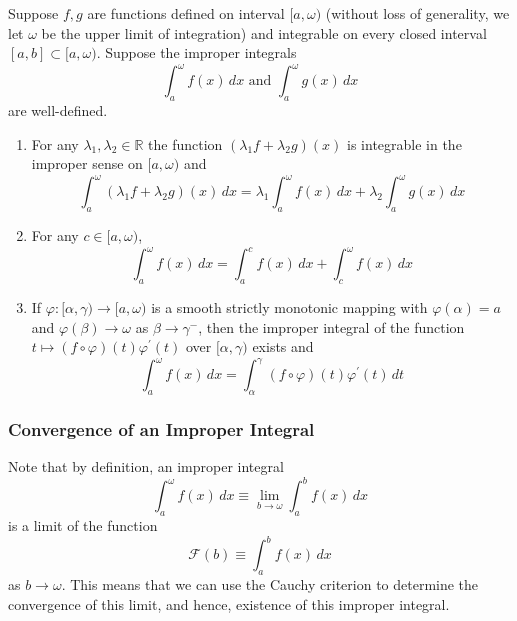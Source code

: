 \documentclass{article}
\begin{document}
      \begin{lemma}
        Suppose $f, g$ are functions defined on interval $[a, \omega)$ (without loss of generality, we let $\omega$ be the upper limit of integration) and integrable on every closed interval $[a, b] \subset [a, \omega)$. Suppose the improper integrals 
        \[\int_a^\omega f(x)\,dx \text{ and } \int_a^\omega g(x)\,dx\]
        are well-defined. 
        \begin{enumerate}
          \item For any $\lambda_1, \lambda_2 \in \mathbb{R}$ the function $(\lambda_1 f + \lambda_2 g)(x)$ is integrable in the improper sense on $[a, \omega)$ and
          \[\int_a^\omega (\lambda_1 f + \lambda_2 g)(x)\,dx = \lambda_1 \int_a^\omega f(x)\,dx + \lambda_2 \int_a^\omega g(x)\,dx\]
          \item For any $c \in [a, \omega)$, 
          \[\int_a^\omega f(x)\,dx = \int_a^c f(x)\,dx + \int_c^\omega f(x)\,dx\]
          \item If $\varphi: [\alpha, \gamma) \longrightarrow [a, \omega)$ is a smooth strictly monotonic mapping with $\varphi(\alpha) = a$ and $\varphi(\beta) \rightarrow \omega$ as $\beta \rightarrow \gamma^-$, then the improper integral of the function $t \mapsto (f \circ \varphi)(t) \varphi^\prime (t)$ over $[\alpha, \gamma)$ exists and 
          \[\int_a^\omega f(x)\,dx = \int_\alpha^\gamma (f \circ \varphi)(t) \varphi^\prime (t)\,dt\]
        \end{enumerate}
      \end{lemma}

      \subsubsection{Convergence of an Improper Integral}

        Note that by definition, an improper integral 
        \[\int_a^\omega f(x)\,dx \equiv \lim_{b \rightarrow \omega} \int_a^b f(x) \,dx\]
        is a limit of the function 
        \[\mathcal{F}(b) \equiv \int_a^b f(x)\,dx\]
        as $b \rightarrow \omega$. This means that we can use the Cauchy criterion to determine the convergence of this limit, and hence, existence of this improper integral. 
\end{document}
